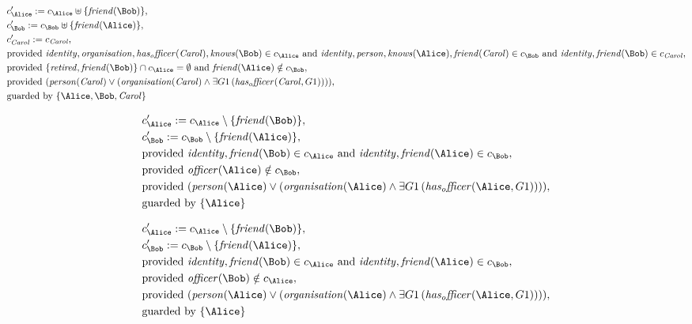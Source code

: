 \begin{align*}
&
c'_
{
\Alice
}
 := 
c_
{
\Alice
}
 \uplus 
\{
\mathit{
friend
}
(
\Bob
)
\}
,\\
&
c'_
{
\Bob
}
 := 
c_
{
\Bob
}
 \uplus 
\{
\mathit{
friend
}
(
\Alice
)
\}
,\\
&
c'_
{
\mathit{Carol}
}
 := 
c_
{
\mathit{Carol}
}
,\\
&
\text{provided } 
\mathit{
identity
}
,
\mathit{
organisation
}
,
\mathit{
has_officer
}
(
\mathit{Carol}
)
,
\mathit{
knows
}
(
\Bob
)
 \in c_
{
\Alice
}
 \text{ and } 
\mathit{
identity
}
,
\mathit{
person
}
,
\mathit{
knows
}
(
\Alice
)
,
\mathit{
friend
}
(
\mathit{Carol}
)
 \in c_
{
\Bob
}
 \text{ and } 
\mathit{
identity
}
,
\mathit{
friend
}
(
\Bob
)
 \in c_
{
\mathit{Carol}
}
,\\
&
\text{provided } 
\{
\mathit{
retired
}
,
\mathit{
friend
}
(
\Bob
)
\}
 \cap c_
{
\Alice
}
 = \emptyset
 \text{ and } 
\mathit{
friend
}
(
\Alice
)
 \notin c_
{
\Bob
}
,\\
&
\text{provided } 
(
\mathit{
person
}
(
\mathit{Carol}
)
\lor
(
\mathit{
organisation
}
(
\mathit{Carol}
)
\land
\exists 
G1
\,(
\mathit{
has_officer
}
(
\mathit{Carol}
,
G1
)
)
)
)
,\\
&
\text{guarded by } \{
\Alice
,
\Bob
,
\mathit{Carol}
\}
\end{align*}

\begin{align*}
&
c'_
{
\Alice
}
 := 
c_
{
\Alice
}
 \setminus 
\{
\mathit{
friend
}
(
\Bob
)
\}
,\\
&
c'_
{
\Bob
}
 := 
c_
{
\Bob
}
 \setminus 
\{
\mathit{
friend
}
(
\Alice
)
\}
,\\
&
\text{provided } 
\mathit{
identity
}
,
\mathit{
friend
}
(
\Bob
)
 \in c_
{
\Alice
}
 \text{ and } 
\mathit{
identity
}
,
\mathit{
friend
}
(
\Alice
)
 \in c_
{
\Bob
}
,\\
&
\text{provided } 
\mathit{
officer
}
(
\Alice
)
 \notin c_
{
\Bob
}
,\\
&
\text{provided } 
(
\mathit{
person
}
(
\Alice
)
\lor
(
\mathit{
organisation
}
(
\Alice
)
\land
\exists 
G1
\,(
\mathit{
has_officer
}
(
\Alice
,
G1
)
)
)
)
,\\
&
\text{guarded by } \{
\Alice
\}
\end{align*}

\begin{align*}
&
c'_
{
\Alice
}
 := 
c_
{
\Alice
}
 \setminus 
\{
\mathit{
friend
}
(
\Bob
)
\}
,\\
&
c'_
{
\Bob
}
 := 
c_
{
\Bob
}
 \setminus 
\{
\mathit{
friend
}
(
\Alice
)
\}
,\\
&
\text{provided } 
\mathit{
identity
}
,
\mathit{
friend
}
(
\Bob
)
 \in c_
{
\Alice
}
 \text{ and } 
\mathit{
identity
}
,
\mathit{
friend
}
(
\Alice
)
 \in c_
{
\Bob
}
,\\
&
\text{provided } 
\mathit{
officer
}
(
\Bob
)
 \notin c_
{
\Alice
}
,\\
&
\text{provided } 
(
\mathit{
person
}
(
\Alice
)
\lor
(
\mathit{
organisation
}
(
\Alice
)
\land
\exists 
G1
\,(
\mathit{
has_officer
}
(
\Alice
,
G1
)
)
)
)
,\\
&
\text{guarded by } \{
\Alice
\}
\end{align*}
